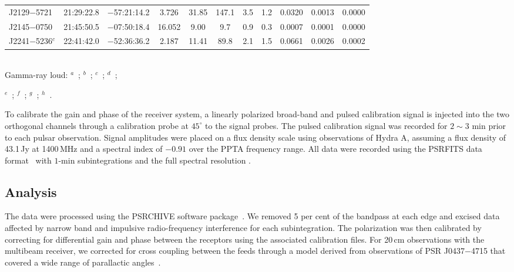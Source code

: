 \documentclass[useAMS,usenatbib]{mn2e}
\begin{document}
\begin{table}
\begin{center}
\begin{tabular}{lcccccccccc}
J2129$-$5721         & 21:29:22.8  &  $-$57:21:14.2 &  3.726  &  31.85    & 147.1    & 3.5       & 1.2    &  0.0320  &  0.0013  &  0.0000  \\ 
J2145$-$0750         & 21:45:50.5  &  $-$07:50:18.4 &  16.052 &  9.00     & 9.7      & 0.9       & 0.3    &  0.0007  &  0.0001  &  0.0000  \\ 
J2241$-$5236$^{c}$   & 22:41:42.0  &  $-$52:36:36.2 &  2.187  &  11.41    & 89.8     & 2.1       & 1.5    &  0.0661  &  0.0026  &  0.0002  \\ 
%
\hline
\end{tabular}
\end{center}
~\\
Gamma-ray loud: $^a$~\citet{Abdo09}; $^b$~\citet{Abdo10}; $^c$~\citet{Keith11}; $^d$~\citet{Keith12}; 

$^e$~\citet{Guillemot12}; $^f$~\citet{Espinoza13}; $^g$~\citet{Abdo13}; $^h$~\citet{Barr13}.
\end{table}

To calibrate the gain and phase of the receiver system, a linearly polarized 
broad-band and pulsed calibration signal is injected into the two orthogonal 
channels through a calibration probe at $45^{\circ}$ to the 
signal probes. The pulsed calibration signal was recorded for $2\sim3$ min prior to 
each pulsar observation.
%
Signal amplitudes were placed on a flux density scale using observations of 
Hydra A, assuming a flux density of 43.1\,Jy at 1400\,MHz and a spectral 
index of $-0.91$ over the PPTA frequency range.
%
All data were recorded using the PSRFITS data format~\citep{Hotan04} with 
$1$-min subintegrations and the full spectral resolution
%
\citep[for further details see][and references therein]{Manchester13}. 
%


\subsection{Analysis}

The data were processed using the PSRCHIVE software package~\citep{Hotan04}. 
We removed 5 per cent of the bandpass at each edge and excised data 
affected by narrow band and impulsive radio-frequency interference for each 
subintegration.
%
The polarization was then calibrated by correcting for differential gain and 
phase between the receptors using the associated calibration files.
%
For 20\,cm observations with the multibeam receiver, we corrected for 
cross coupling between the feeds through a model derived from observations of 
PSR J0437$-$4715 that covered a wide range of parallactic angles~\citep{VanStraten04}.
%
\end{document}

